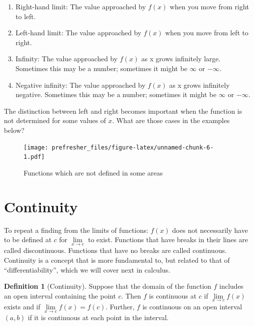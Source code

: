 \documentclass[
]{book}
\providecommand{\tightlist}{%
  \setlength{\itemsep}{0pt}\setlength{\parskip}{0pt}}
\theoremstyle{definition}
\newtheorem{definition}{Definition}[chapter]
\theoremstyle{definition}
\theoremstyle{definition}
\theoremstyle{remark}
\begin{document}
\begin{enumerate}
\def\labelenumi{\arabic{enumi}.}
\tightlist
\item
  Right-hand limit: The value approached by \(f(x)\) when you move from right to left.
\item
  Left-hand limit: The value approached by \(f(x)\) when you move from left to right.
\item
  Infinity: The value approached by \(f(x)\) as x grows infinitely large. Sometimes this may be a number; sometimes it might be \(\infty\) or \(-\infty\).
\item
  Negative infinity: The value approached by \(f(x)\) as x grows infinitely negative. Sometimes this may be a number; sometimes it might be \(\infty\) or \(-\infty\).
\end{enumerate}

The distinction between left and right becomes important when the function is not determined for some values of \(x\). What are those cases in the examples below?

\begin{figure}
\centering
\texttt{[image: prefresher\_files/figure-latex/unnamed-chunk-6-1.pdf]}
\caption{\label{fig:unnamed-chunk-6}Functions which are not defined in some areas}
\end{figure}

\hypertarget{continuity}{%
\section{Continuity}\label{continuity}}

To repeat a finding from the limits of functions: \(f(x)\) does not necessarily have to be defined at \(c\) for \(\lim\limits_{x \to c}\) to exist. Functions that have breaks in their lines are called discontinuous. Functions that have no breaks are called continuous. Continuity is a concept that is more fundamental to, but related to that of ``differentiability'', which we will cover next in calculus.

\begin{definition}[Continuity]
\protect\hypertarget{def:unnamed-chunk-7}{}{\label{def:unnamed-chunk-7} {} }Suppose that the domain of the function \(f\) includes an open interval containing the point \(c\). Then \(f\) is continuous at \(c\) if \(\lim\limits_{x \to c} f(x)\) exists and if \(\lim\limits_{x \to c} f(x)=f(c)\). Further, \(f\) is continuous on an open interval \((a,b)\) if it is continuous at each point in the interval.
\end{definition}
\end{document}
